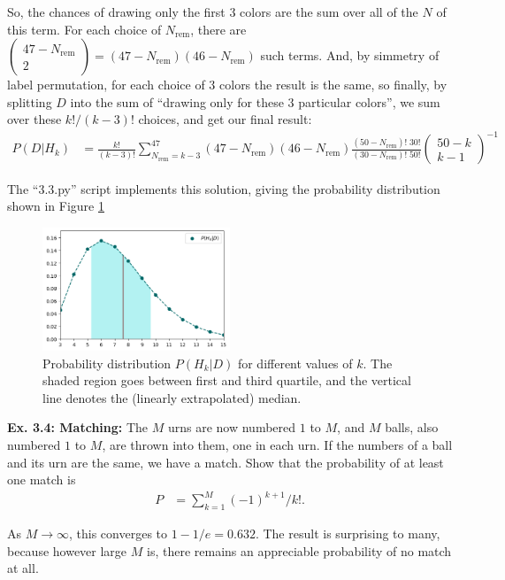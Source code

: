 \documentclass{article}
\begin{document}
So, the chances of drawing only the first $3$ colors are the sum over all of the $N$ of this term. For each choice of $N_\text{rem}$, there are $\begin{pmatrix}47-N_\text{rem}\\2\end{pmatrix}=(47-N_\text{rem})(46-N_\text{rem})$ such terms. And, by simmetry of label permutation, for each choice of $3$ colors the result is the same, so finally, by splitting $D$ into the sum of ``drawing only for these $3$ particular colors'', we sum over these $k!/(k-3)!$ choices, and get our final result:
\begin{align}
	P(D|H_k)&=\frac{k!}{(k-3)!}\sum_{N_\text{rem}=k-3}^{47}(47-N_\text{rem})(46-N_\text{rem})\frac{(50-N_\text{rem})!\;30!}{(30-N_\text{rem})!\;50!}\begin{pmatrix}50-k\\k-1\end{pmatrix}^{-1}
\end{align}

The ``3.3.py'' script implements this solution, giving the probability distribution shown in Figure \ref{fig:3.3}
\begin{figure}[h]
	\center
	\includegraphics[width=0.5\textwidth]{Numerical/3.3.png}
	\caption{Probability distribution $P(H_k|D)$ for different values of $k$. The shaded region goes between first and third quartile, and the vertical line denotes the (linearly extrapolated) median.}
	\label{fig:3.3}
\end{figure}

\textbf{Ex. 3.4: Matching: }The $M$ urns are now numbered $1$ to $M$, and $M$ balls, also numbered $1$ to $M$, are thrown into them, one in each urn. If the numbers of a ball and its urn are the same, we have a match. Show that the probability of at least one match is
\begin{align*}
	P&=\sum_{k=1}^M(-1)^{k+1}/k!.
\end{align*}

As $M\rightarrow\infty$, this converges to $1-1/e=0.632$. The result is surprising to many, because however large $M$ is, there remains an appreciable probability of no match at all.
\end{document}
